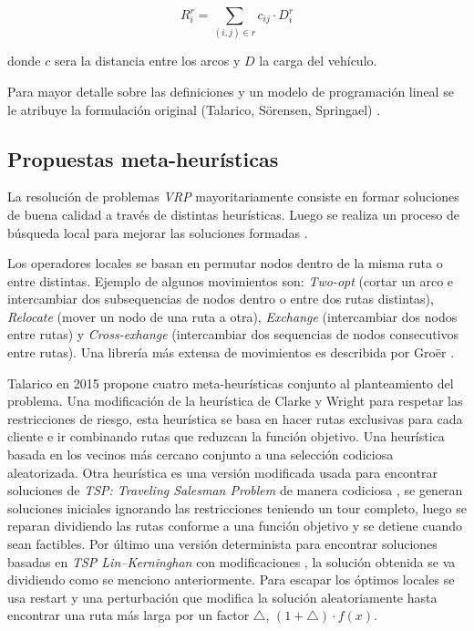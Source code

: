 \documentclass[conference]{IEEEtran}
\begin{document}
\begin{equation}
    R^r_{i} = \sum_{(i,j)\in r} c_{ij} \cdot D^r_i
\end{equation}

donde $c$ sera la distancia entre los arcos y $D$ la carga del vehículo.


Para mayor detalle sobre las definiciones y un modelo de programación lineal se le atribuye la formulación original (Talarico, Sörensen, Springael) \cite{TALARICO2015457}.




\subsection{Propuestas meta-heurísticas}

La resolución de problemas \textit{VRP} mayoritariamente consiste en formar soluciones de buena calidad a través de distintas heurísticas. Luego se realiza un proceso de búsqueda local para mejorar las soluciones formadas \cite{BRAEKERS2016300}.

Los operadores locales se basan en permutar nodos dentro de la misma ruta o entre distintas. Ejemplo de algunos movimientos son: \textit{Two-opt} (cortar un arco e intercambiar dos subsequencias de nodos dentro o entre dos rutas distintas), \textit{Relocate} (mover un nodo de una ruta a otra), \textit{Exchange} (intercambiar dos nodos entre rutas)  y \textit{Cross-exhange} (intercambiar dos sequencias de nodos consecutivos entre rutas)\cite{braysy2005vehicle}. Una librería más extensa de movimientos es describida por Groër \cite{groer2010library}.


Talarico en 2015 \cite{TALARICO2015457} propone cuatro meta-heurísticas conjunto al planteamiento del problema. Una modificación de la heurística de Clarke y Wright \cite{clarke&wright} para respetar las restricciones de riesgo, esta heurística se basa en hacer rutas exclusivas para cada cliente e ir combinando rutas que reduzcan la función objetivo. Una heurística  basada en los vecinos más cercano conjunto a una selección codiciosa aleatorizada. Otra heurística es una versión modificada usada para encontrar soluciones de \textit{TSP: Traveling Salesman Problem} de manera codiciosa \cite{prins}, se generan soluciones iniciales ignorando las restricciones teniendo un tour completo, luego se reparan dividiendo las rutas conforme a una función objetivo y se detiene cuando sean factibles. Por último una versión determinista para encontrar soluciones basadas en \textit{TSP Lin–Kerninghan} \cite{tlk} con modificaciones \cite{HELSGAUN2000106}\cite{helsgaun2006effective}, la solución obtenida se va dividiendo como se menciono anteriormente. Para escapar los óptimos locales se usa restart y una perturbación que modifica la solución aleatoriamente hasta encontrar una ruta más larga por un factor $\triangle$, $(1+\triangle)\cdot f(x)$.
\end{document}

